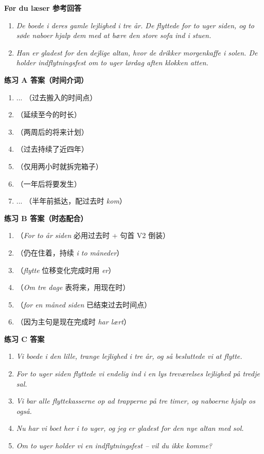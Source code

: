 \begin{answerbox}
\textbf{Før du læser 参考回答}
\begin{enumerate}
  \item \textit{De boede i deres gamle lejlighed i tre år. De flyttede for to uger siden, og to søde naboer hjalp dem med at bære den store sofa ind i stuen.}
  \item \textit{Han er gladest for den dejlige altan, hvor de drikker morgenkaffe i solen. De holder indflytningsfest om to uger lørdag aften klokken atten.}
\end{enumerate}

\textbf{练习 A 答案（时间介词）}
\begin{enumerate}
  \item {} ... （过去搬入的时间点）
  \item {}（延续至今的时长）
  \item {}（两周后的将来计划）
  \item {}（过去持续了近四年）
  \item {}（仅用两小时就拆完箱子）
  \item {}（一年后将要发生）
  \item {} ... （半年前抵达，配过去时 \textit{kom}）
\end{enumerate}

\textbf{练习 B 答案（时态配合）}
\begin{enumerate}
  \item {}（\textit{For to år siden} 必用过去时 + 句首 V2 倒装）
  \item {}（仍在住着，持续 \textit{i to måneder}）
  \item {}（\textit{flytte} 位移变化完成时用 \textit{er}）
  \item {}（\textit{Om tre dage} 表将来，用现在时）
  \item {}（\textit{for en måned siden} 已结束过去时间点）
  \item {}（因为主句是现在完成时 \textit{har lært}）
\end{enumerate}

\textbf{练习 C 答案}
\begin{enumerate}
  \item \textit{Vi boede i den lille, trange lejlighed i tre år, og så besluttede vi at flytte.}
  \item \textit{For to uger siden flyttede vi endelig ind i en lys treværelses lejlighed på tredje sal.}
  \item \textit{Vi bar alle flyttekasserne op ad trapperne på tre timer, og naboerne hjalp os også.}
  \item \textit{Nu har vi boet her i to uger, og jeg er gladest for den nye altan med sol.}
  \item \textit{Om to uger holder vi en indflytningsfest -- vil du ikke komme?}
\end{enumerate}


\end{answerbox}
